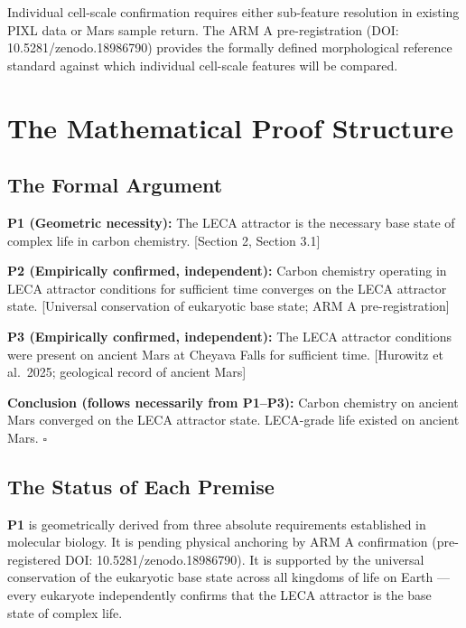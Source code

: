 \documentclass[11pt, a4paper]{article}
\begin{document}
Individual cell-scale confirmation requires either
sub-feature resolution in existing PIXL data or
Mars sample return. The ARM A pre-registration
(DOI: 10.5281/zenodo.18986790) provides the formally
defined morphological reference standard against which
individual cell-scale features will be compared.

\section{The Mathematical Proof Structure}

\subsection{The Formal Argument}

\begin{mdframed}[
  linecolor=rulecolor,
  linewidth=0.8pt,
  innertopmargin=0.6em,
  innerbottommargin=0.6em,
  innerleftmargin=1em,
  innerrightmargin=1em
]
\textbf{P1 (Geometric necessity):}
The LECA attractor is the necessary base state of
complex life in carbon chemistry. [Section 2, Section 3.1]

\medskip
\textbf{P2 (Empirically confirmed, independent):}
Carbon chemistry operating in LECA attractor conditions
for sufficient time converges on the LECA attractor state.
[Universal conservation of eukaryotic base state;
ARM A pre-registration]

\medskip
\textbf{P3 (Empirically confirmed, independent):}
The LECA attractor conditions were present on ancient
Mars at Cheyava Falls for sufficient time.
[Hurowitz et al.\ 2025; geological record of
ancient Mars]

\medskip
\textbf{Conclusion (follows necessarily from P1--P3):}
Carbon chemistry on ancient Mars converged on the
LECA attractor state. LECA-grade life existed on
ancient Mars. $\square$
\end{mdframed}

\subsection{The Status of Each Premise}

\textbf{P1} is geometrically derived from three absolute
requirements established in molecular biology. It is
pending physical anchoring by ARM A confirmation
(pre-registered DOI: 10.5281/zenodo.18986790).
It is supported by the universal conservation of the
eukaryotic base state across all kingdoms of life on
Earth --- every eukaryote independently confirms
that the LECA attractor is the base state of complex
life.
\end{document}
